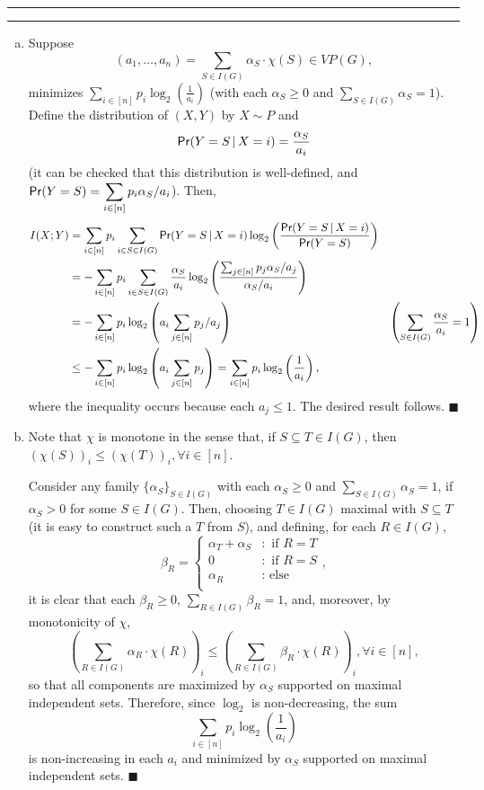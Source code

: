 \documentclass[11pt]{article}
\newcounter{questionCounter}
\newcounter{partCounter}[questionCounter]
\newenvironment{question}[2][\arabic{questionCounter}]{%
    \setcounter{partCounter}{0}%
    \vspace{.25in} \hrule \vspace{0.5em}%
        \noindent{\bf #2}%
    \vspace{0.8em} \hrule \vspace{.10in}%
    \addtocounter{questionCounter}{1}%
}{}
\renewcommand{\qed}{\quad $\blacksquare$}
\newcommand{\pr}{\operatornamewithlimits{\mathsf{Pr}}} %
\newcommand{\giv}{\, | \,} %
\begin{document}
\begin{question}{Problem 4}
\begin{enumerate}[(a)]
\item Suppose
\[(a_1,\dots,a_n) = \sum_{S \in I(G)} \alpha_S \cdot \chi(S) \in VP(G),\]
minimizes $\sum_{i \in [n]} p_i \log_2 \left( \frac{1}{a_i} \right)$ (with each
$\alpha_S \geq 0$ and $\sum_{S \in I(G)} \alpha_S = 1$). Define the
distribution of $(X,Y)$ by $X \sim P$ and
\[\pr(Y = S \giv X = i) = \frac{\alpha_S}{a_i}\]
(it can be checked that this distribution is well-defined, and
$\displaystyle\pr(Y = S) = \sum_{i \in [n]}p_i \alpha_S/a_i$). Then,
\begin{align*}
I(X;Y)
    & = \sum_{i \in [n]} p_i \sum_{i \in S \in I(G)} \pr(Y = S \giv X = i)
            \log_2 \left( \frac{\pr(Y = S \giv X = i)}{\pr(Y = S)} \right)  \\
    & = -\sum_{i \in [n]} p_i \sum_{i \in S \in I(G)} \frac{\alpha_S}{a_i}
            \log_2 \left( \frac{\sum_{j \in [n]} p_j \alpha_S/a_j}
                                            {\alpha_S/a_i} \right)  \\
    & = -\sum_{i \in [n]} p_i
            \log_2 \left( a_i\sum_{j \in [n]} p_j/a_j \right)
    & \left( \sum_{S \in I(G)} \frac{\alpha_S}{a_i} = 1 \right) \\
    & \leq -\sum_{i \in [n]} p_i \log_2 \left( a_i \sum_{j \in [n]} p_j \right)
      = \sum_{i \in [n]} p_i \log_2 \left( \frac{1}{a_i} \right),
\end{align*}
where the inequality occurs because each $a_j \leq 1$. The desired result
follows. \qed

\item
Note that $\chi$ is monotone in the sense that, if $S \subseteq T \in I(G)$,
then $(\chi(S))_i \leq (\chi(T))_i, \forall i \in [n]$.

Consider any family $\{\alpha_S\}_{S \in I(G)}$ with each $\alpha_S \geq 0$ and
$\sum_{S \in I(G)} \alpha_S = 1$, if $\alpha_S > 0$ for
some $S \in I(G)$. Then, choosing $T \in I(G)$ maximal with
$S \subseteq T$ (it is easy to construct such a $T$ from $S$), and defining,
for each $R \in I(G)$,
\[\beta_R
    = \left\{
        \begin{array}{cl}
            \alpha_T + \alpha_S & : \mbox{ if } R = T   \\
            0                   & : \mbox{ if } R = S   \\
            \alpha_R            & : \mbox{ else }       \\
        \end{array}
    \right.,
\]
it is clear that each $\beta_R \geq 0$, $\sum_{R \in I(G)} \beta_R = 1$, and,
moreover, by monotonicity of $\chi$,
\[\left( \sum_{R \in I(G)} \alpha_R \cdot \chi(R) \right)_i
    \leq
    \left( \sum_{R \in I(G)} \beta_R \cdot \chi(R) \right)_i,
    \forall i \in [n],
\]
so that all components are maximized by $\alpha_S$ supported on maximal
independent sets. Therefore, since $\log_2$ is non-decreasing, the sum
\[\sum_{i \in [n]} p_i \log_2 \left( \frac{1}{a_i} \right)\]
is non-increasing in each $a_i$ and minimized by $\alpha_S$ supported
on maximal independent sets. \qed
\end{enumerate}
\end{question}
\end{document}
